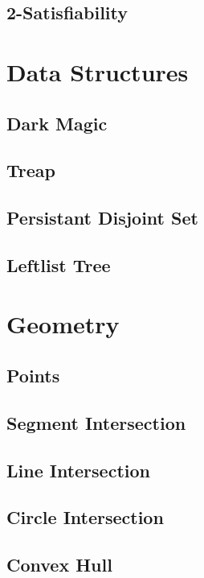 \documentclass[a4paper,10pt,twocolumn,oneside]{article}
\begin{document}
\subsection{2-Satisfiability}

\section{Data Structures}
\subsection{Dark Magic}

\subsection{Treap}

\subsection{Persistant Disjoint Set}

\subsection{Leftlist Tree}

\section{Geometry}
\subsection{Points}

\subsection{Segment Intersection}

\subsection{Line Intersection}

\subsection{Circle Intersection}

\subsection{Convex Hull}

\end{document}
